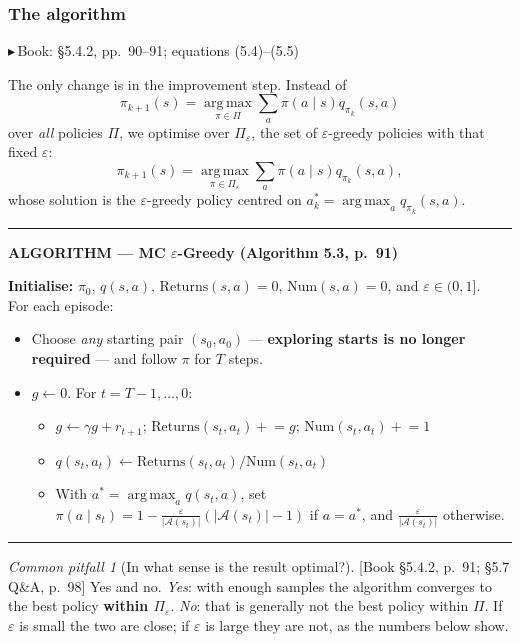 \documentclass[11pt, letterpaper]{article}
\theoremstyle{runin}
\theoremstyle{runinplain}
\theoremstyle{remark}
\newtheorem*{warning}{Common pitfall}
\newcommand{\Aspace}{\mathcal{A}}
\newcommand{\argmax}{\operatorname*{arg\,max}}
\newcommand{\bk}[1]{{\color{bookblue}\small$\blacktriangleright$\,\textsf{Book: #1}}}
\newcommand{\bkin}[1]{{\color{bookblue}\small[\textsf{Book #1}]}}
\newenvironment{algobox}[1]
  {\par\medskip\noindent\rule{\textwidth}{0.9pt}\par\nobreak\vspace{0.25em}
   \noindent\textbf{\small ALGORITHM --- #1}\par\nobreak\vspace{0.15em}
   \small}
  {\par\nobreak\vspace{0.25em}\noindent\rule{\textwidth}{0.9pt}\par\medskip}
\begin{document}
\subsubsection{The algorithm}

\bk{\S5.4.2, pp.~90--91; equations (5.4)--(5.5)}

The only change is in the improvement step. Instead of
\[
  \pi_{k+1}(s)=\argmax_{\pi\in\Pi}\sum_a\pi(a\mid s)q_{\pi_k}(s,a)
  \tag{5.4}
\]
over \emph{all} policies $\Pi$, we optimise over $\Pi_\varepsilon$, the set of
$\varepsilon$-greedy policies with that fixed $\varepsilon$:
\[
  \pi_{k+1}(s)=\argmax_{\pi\in\Pi_\varepsilon}\sum_a\pi(a\mid s)q_{\pi_k}(s,a),
  \tag{5.5}
\]
whose solution is the $\varepsilon$-greedy policy centred on
$a_k^*=\argmax_a q_{\pi_k}(s,a)$.

\begin{algobox}{MC $\varepsilon$-Greedy (Algorithm 5.3, p.~91)}
\textbf{Initialise:} $\pi_0$, $q(s,a)$, $\mathrm{Returns}(s,a)=0$,
$\mathrm{Num}(s,a)=0$, and $\varepsilon\in(0,1]$.\\
For each episode:
\begin{itemize}\itemsep0pt
  \item Choose \emph{any} starting pair $(s_0,a_0)$ --- \textbf{exploring starts is
        no longer required} --- and follow $\pi$ for $T$ steps.
  \item $g\leftarrow0$. For $t=T-1,\dots,0$:
    \begin{itemize}\itemsep0pt
      \item $g\leftarrow\gamma g+r_{t+1}$;\quad
            $\mathrm{Returns}(s_t,a_t)\mathrel{+}=g$;\quad
            $\mathrm{Num}(s_t,a_t)\mathrel{+}=1$
      \item $q(s_t,a_t)\leftarrow\mathrm{Returns}(s_t,a_t)/\mathrm{Num}(s_t,a_t)$
      \item With $a^*=\argmax_a q(s_t,a)$, set
            $\pi(a\mid s_t)=1-\frac{\varepsilon}{|\Aspace(s_t)|}(|\Aspace(s_t)|-1)$
            if $a=a^*$, and $\frac{\varepsilon}{|\Aspace(s_t)|}$ otherwise.
    \end{itemize}
\end{itemize}
\end{algobox}

\begin{warning}[In what sense is the result optimal?]
\bkin{\S5.4.2, p.~91; \S5.7 Q\&A, p.~98} Yes and no. \emph{Yes}: with enough samples
the algorithm converges to the best policy \textbf{within $\Pi_\varepsilon$}.
\emph{No}: that is generally not the best policy within $\Pi$. If $\varepsilon$ is
small the two are close; if $\varepsilon$ is large they are not, as the numbers
below show.
\end{warning}
\end{document}
